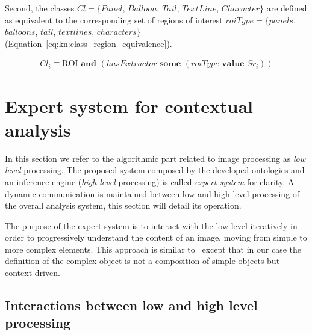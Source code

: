 Second, the classes $Cl=\{Panel$, $Balloon$, $Tail$, $TextLine$, $Character\}$ are defined as equivalent to the corresponding set of regions of interest $roiType = \{panels$, $balloons$, $tail$, $text lines$, $characters\}$ (Equation~\ref{eq:kn:class_region_equivalence}).%
  

\begin{equation}
\label{eq:kn:class_region_equivalence}
\begin{split}
Cl_i  \equiv \text{ROI} \textbf{ and } (hasExtractor \textbf{ some } (roiType \textbf{ value } Sr_i ))
\end{split}
\end{equation}



\section{Expert system for contextual analysis} %
\label{sec:kn:expert_system}

In this section we refer to the algorithmic part related to image processing as \emph{low level} processing. 
The proposed system composed by the developed ontologies and an inference engine (\emph{high level} processing) is called \emph{expert system} for clarity.
A dynamic communication is maintained between low and high level processing of the overall analysis system, this section will detail its operation.

The purpose of the expert system is to interact with the low level iteratively in order to progressively understand the content of an image, moving from simple to more complex elements.
This approach is similar to~\cite{Sciascio2011Structured} except that in our case the definition of the complex object is not a composition of simple objects but context-driven.


\subsection{Interactions between low and high level processing} %
\label{sub:interactions_between_low_and_high_level_processing}

